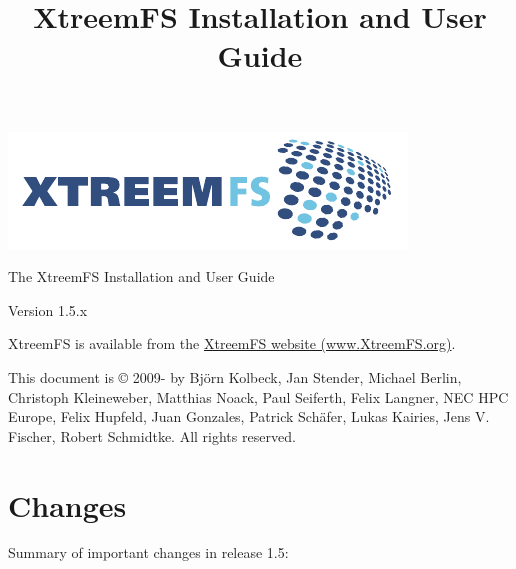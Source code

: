 \documentclass[a4paper,10pt]{book}
\title{XtreemFS Installation and User Guide}
\begin{document}
\begin{titlepage}
\begin{flushright}
 \includegraphics{images/final_logo.pdf}
\end{flushright}

\vspace{3cm}

\begin{flushleft}
\sffamily \begin{LARGE}The XtreemFS Installation and User Guide\end{LARGE}

Version 1.5.x
\end{flushleft}


\end{titlepage}
\garamond
XtreemFS is available from the \href{http://www.XtreemFS.org}{XtreemFS website (www.XtreemFS.org)}.


This document is \copyright{} 2009-\the\year{} by Bj\"orn Kolbeck, Jan Stender, Michael Berlin, Christoph Kleineweber, Matthias Noack, Paul Seiferth, Felix Langner, NEC HPC Europe, Felix Hupfeld, Juan Gonzales, Patrick Sch\"afer, Lukas Kairies, Jens V. Fischer, Robert Schmidtke. All rights reserved.

\setcounter{tocdepth}{2}
\tableofcontents

\chapter*{Changes}
Summary of important changes in release 1.5:
\end{document}
